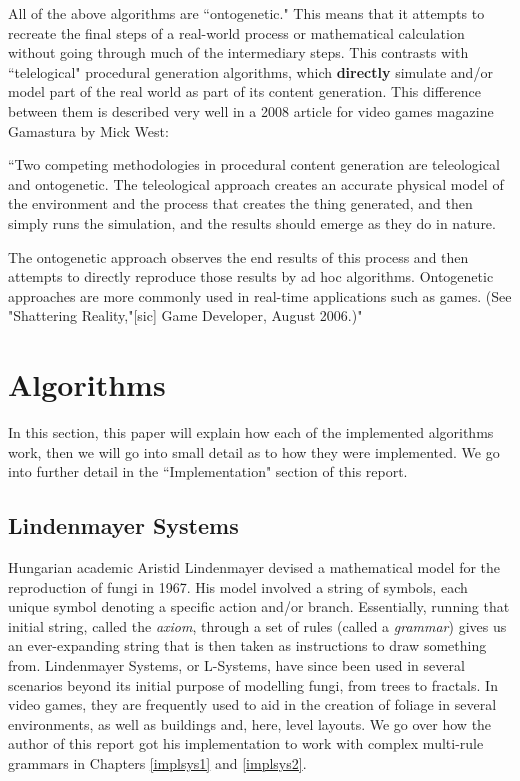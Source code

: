 All of the above algorithms are ``ontogenetic." This means that it attempts to recreate the final steps of a real-world process or mathematical calculation without going through much of the intermediary steps.\cite{pcgwikionto} This contrasts with ``telelogical" procedural generation algorithms, which \textbf{directly} simulate and/or model part of the real world as part of its content generation.\cite{pcgwikitele} This difference between them is described very well in a 2008 article for video games magazine Gamastura by Mick West:

``Two competing methodologies in procedural content generation are teleological and ontogenetic. The teleological approach creates an accurate physical model of the environment and the process that creates the thing generated, and then simply runs the simulation, and the results should emerge as they do in nature.

The ontogenetic approach observes the end results of this process and then attempts to directly reproduce those results by ad hoc algorithms. Ontogenetic approaches are more commonly used in real-time applications such as games. (See "Shattering Reality,"[sic] Game Developer, August 2006.)"\cite{teleonto}\cite{shatteringreality}\cite{randomscattering}

\section{Algorithms}

In this section, this paper will explain how each of the implemented algorithms work, then we will go into small detail as to how they were implemented. We go into further detail in the ``Implementation" section of this report.

\subsection{Lindenmayer Systems} \label{alglsys}

Hungarian academic Aristid Lindenmayer devised a mathematical model for the reproduction of fungi in 1967.\cite{LINDENMAYER1968300} His model involved a string of symbols, each unique symbol denoting a specific action and/or branch. Essentially, running that initial string, called the \emph{axiom}, through a set of rules (called a \emph{grammar}) gives us an ever-expanding string that is then taken as instructions to draw something from. Lindenmayer Systems, or L-Systems, have since been used in several scenarios beyond its initial purpose of modelling fungi, from trees to fractals. In video games, they are frequently used to aid in the creation of foliage in several environments, as well as buildings and, here, level layouts. We go over how the author of this report got his implementation to work with complex multi-rule grammars in Chapters \ref{implsys1} and \ref{implsys2}.

